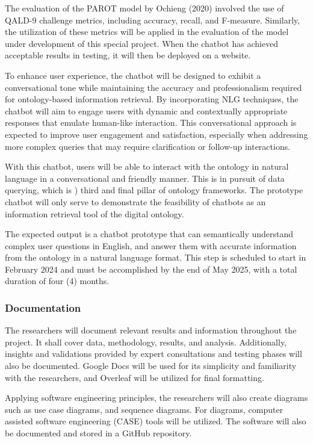     The evaluation of the PAROT model by Ochieng (2020) involved the use of QALD-9 challenge metrics, including accuracy, recall, and F-measure. Similarly, the utilization of these metrics will be applied in the evaluation of the model under development of this special project. When the chatbot has achieved acceptable results in testing, it will then be deployed on a website.
    
    To enhance user experience, the chatbot will be designed to exhibit a conversational tone while maintaining the accuracy and professionalism required for ontology-based information retrieval. By incorporating NLG techniques, the chatbot will aim to engage users with dynamic and contextually appropriate responses that emulate human-like interaction. This conversational approach is expected to improve user engagement and satisfaction, especially when addressing more complex queries that may require clarification or follow-up interactions.

    With this chatbot, users will be able to interact with the ontology in natural language in a conversational and friendly manner. This is in pursuit of data querying, which is ) third and final pillar of ontology frameworks. The prototype chatbot will only serve to demonstrate the feasibility of chatbots as an information retrieval tool of the digital ontology.

    The expected output is a chatbot prototype that can semantically understand complex user questions in English, and answer them with accurate information from the ontology in a natural language format. This step is scheduled to start in February 2024 and must be accomplished by the end of May 2025, with a total duration of four (4) months.

\subsubsection{Documentation}

    The researchers will document relevant results and information throughout the project. It shall cover  data, methodology, results, and analysis. Additionally, insights and validations provided by expert consultations and testing phases will also be documented. Google Docs will be used for its simplicity and familiarity with the researchers, and Overleaf will be utilized for final formatting. 
    
    Applying software engineering principles, the researchers will also create diagrams such as use case diagrams, and sequence diagrams. For diagrams, computer assisted software engineering (CASE) tools will be utilized. The software will also be documented and stored in a GitHub repository.
    
